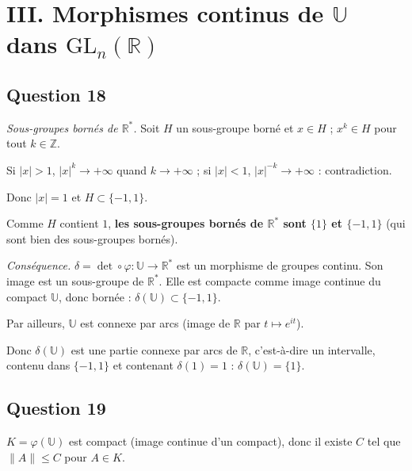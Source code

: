 \documentclass[11pt,a4paper]{article}
\newcommand{\equationajustee}[1]{%
  \sbox{\boiteequation}{$\displaystyle #1$}%
  \ifdim\wd\boiteequation>\linewidth
    \[\resizebox{\linewidth}{!}{\usebox{\boiteequation}}\]%
  \else
    \[#1\]%
  \fi}
\begin{document}
\hypertarget{iii.-morphismes-continus-de-mathbbu-dans-mathrmgl_nmathbbr}{%
\section{\texorpdfstring{III. Morphismes continus de \(\mathbb{U}\) dans \({\mathrm{GL}}_n(\mathbb{R})\)}{III. Morphismes continus de \textbackslash mathbb\{U\} dans \{\textbackslash mathrm\{GL\}\}\_n(\textbackslash mathbb\{R\})}}\label{iii.-morphismes-continus-de-mathbbu-dans-mathrmgl_nmathbbr}}

\hypertarget{question-18}{%
\subsection{Question 18}\label{question-18}}

\emph{Sous-groupes bornés de \({\mathbb{R}}^*\).} Soit \(H\) un sous-groupe borné et \(x\in H\) ; \(x^k\in H\) pour tout \(k\in\mathbb{Z}\).

Si \(|x|>1\), \(|x|^k\to+\infty\) quand \(k\to+\infty\) ; si \(|x|<1\), \(|x|^{-k}\to+\infty\) : contradiction.

Donc \(|x|=1\) et \(H\subset\{-1,1\}\).

Comme \(H\) contient \(1\), \textbf{les sous-groupes bornés de \({\mathbb{R}}^*\) sont \(\{1\}\) et \(\{-1,1\}\)} (qui sont bien des sous-groupes bornés).

\emph{Conséquence.} \(\delta=\det\circ\varphi:\mathbb{U}\to{\mathbb{R}}^*\) est un morphisme de groupes continu. Son image est un sous-groupe de \({\mathbb{R}}^*\). Elle est compacte comme image continue du compact \(\mathbb{U}\), donc bornée : \(\delta(\mathbb{U})\subset\{-1,1\}\).

Par ailleurs, \(\mathbb{U}\) est connexe par arcs (image de \(\mathbb{R}\) par \(t\mapsto e^{it}\)).

Donc \(\delta(\mathbb{U})\) est une partie connexe par arcs de \(\mathbb{R}\), c'est-à-dire un intervalle, contenu dans \(\{-1,1\}\) et contenant \(\delta(1)=1\) : \(\delta(\mathbb{U})=\{1\}\).

\equationajustee{\boxed{\varphi(\mathbb{U})\subset{\mathrm{SL}}_n(\mathbb{R}).}}

\hypertarget{question-19}{%
\subsection{Question 19}\label{question-19}}

\(K=\varphi(\mathbb{U})\) est compact (image continue d'un compact), donc il existe \(C\) tel que \(\|A\|\le C\) pour \(A\in K\).
\end{document}
